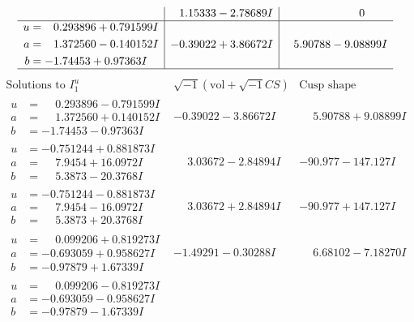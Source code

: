\documentclass[1p]{elsarticle_modified}
\theoremstyle{definition}
\newcommand{\I}{\sqrt{-1}}
\begin{document}
$$\begin{array}{c|c|c}
 & \phantom{-}1.15333 - 2.78689 I & \phantom{-0.000000 } 0 \\ \hline\begin{aligned}
u &= \phantom{-}0.293896 + 0.791599 I \\
a &= \phantom{-}1.372560 - 0.140152 I \\
b &= -1.74453 + 0.97363 I\end{aligned}
 & -0.39022 + 3.86672 I & \phantom{-}5.90788 - 9.08899 I\\
 \hline 
 \end{array}$$\newpage$$\begin{array}{c|c|c}  
\text{Solutions to }I^u_{1}& \I (\text{vol} + \sqrt{-1}CS) & \text{Cusp shape}\\
 \hline 
\begin{aligned}
u &= \phantom{-}0.293896 - 0.791599 I \\
a &= \phantom{-}1.372560 + 0.140152 I \\
b &= -1.74453 - 0.97363 I\end{aligned}
 & -0.39022 - 3.86672 I & \phantom{-}5.90788 + 9.08899 I \\ \hline\begin{aligned}
u &= -0.751244 + 0.881873 I \\
a &= \phantom{-}7.9454 + 16.0972 I \\
b &= \phantom{-}5.3873 - 20.3768 I\end{aligned}
 & \phantom{-}3.03672 - 2.84894 I & -90.977 - 147.127 I \\ \hline\begin{aligned}
u &= -0.751244 - 0.881873 I \\
a &= \phantom{-}7.9454 - 16.0972 I \\
b &= \phantom{-}5.3873 + 20.3768 I\end{aligned}
 & \phantom{-}3.03672 + 2.84894 I & -90.977 + 147.127 I \\ \hline\begin{aligned}
u &= \phantom{-}0.099206 + 0.819273 I \\
a &= -0.693059 + 0.958627 I \\
b &= -0.97879 + 1.67339 I\end{aligned}
 & -1.49291 - 0.30288 I & \phantom{-}6.68102 - 7.18270 I \\ \hline\begin{aligned}
u &= \phantom{-}0.099206 - 0.819273 I \\
a &= -0.693059 - 0.958627 I \\
b &= -0.97879 - 1.67339 I\end{aligned}

\end{array}$$
\end{document}
